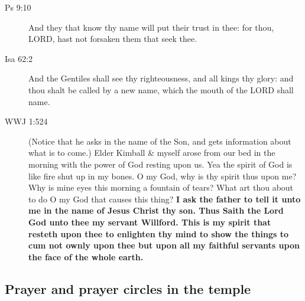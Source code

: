\begin{description}
		\item[Ps 9:10] And they that know thy name will put their trust in thee: for thou, LORD, hast not forsaken them that seek thee.
		\item[Isa 62:2] And the Gentiles shall see thy righteousness, and all kings thy glory: and thou shalt be called by a new name, which the mouth of the LORD shall name.
		\item[WWJ 1:524] (Notice that he asks in the name of the Son, and gets information about what is to come.) Elder Kimball \& myself arose from our bed in the morning with the power of God resting upon us. Yea the spirit of God is like fire shut up in my bones. O my God, why is thy spirit thus upon me? Why is mine eyes this morning a fountain of tears? What art thou about to do O my God that causes this thing? \textbf{I ask the father to tell it unto me in the name of Jesus Christ thy son. Thus Saith the Lord God unto thee my servant Willford. This is my spirit that resteth upon thee to enlighten thy mind to show the things to cum not ownly upon thee but upon all my faithful servants upon the face of the whole earth.}
		\end{description}
		
	\subsection{Prayer and prayer circles in the temple} %

